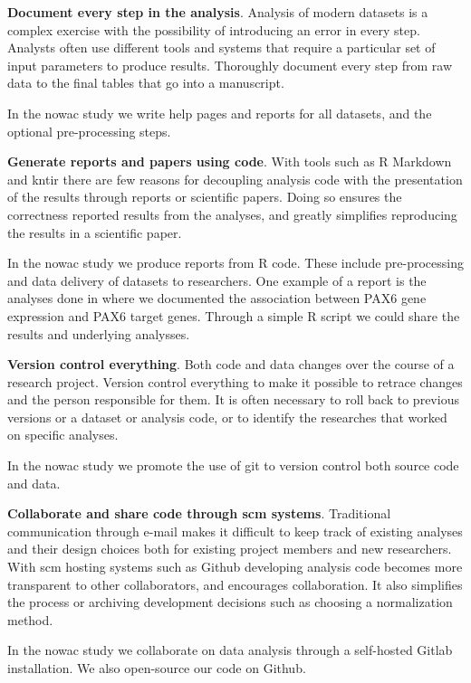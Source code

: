 \textbf{Document every step in the analysis}. Analysis of modern datasets is a
complex exercise with the possibility of introducing an error in every step.
Analysts often use different tools and systems that require a particular set of
input parameters to produce results. Thoroughly document every step from raw
data to the final tables that go into a manuscript.

In the \gls{nowac} study we write help pages and reports for all datasets, and
the optional pre-processing steps. 

\textbf{Generate reports and papers using code}. With tools such as R
Markdown\cite{rmarkdown} and kntir there are few reasons for decoupling analysis
code with the presentation of the results through reports or scientific papers.
Doing so ensures the correctness reported results from the analyses, and greatly
simplifies reproducing the results in a scientific paper. 

In the \gls{nowac} study we produce reports from R code. These include
pre-processing and data delivery of datasets to researchers. One example of a
report is the analyses done in \cite{kiselev2018transcription} where we
documented the association between PAX6 gene expression and PAX6 target genes.
Through a simple R script we could share the results and underlying analysses.

\textbf{Version control everything}. Both code and data changes over the course
of a research project. Version control everything to make it possible to retrace
changes and the person responsible for them. It is often necessary to roll back
to previous versions or a dataset or analysis code, or to identify the
researches that worked on specific analyses. 

In the \gls{nowac} study we promote the use of git to version control both
source code and data. 

\textbf{Collaborate and share code through \gls{scm} systems}. Traditional
communication through e-mail makes it difficult to keep track of existing
analyses and their design choices both for existing project members and new
researchers. With \gls{scm} hosting systems such as Github developing
analysis code becomes more transparent to other collaborators, and encourages
collaboration. It also simplifies the process or archiving development decisions
such as choosing a normalization method.

In the \gls{nowac} study we collaborate on data analysis through a self-hosted
Gitlab\cite{gitlab} installation. We also open-source our code on
Github. 

